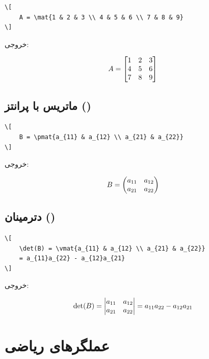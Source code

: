 \begin{latin}
\begin{verbatim}
\[
    A = \mat{1 & 2 & 3 \\ 4 & 5 & 6 \\ 7 & 8 & 9}
\]
\end{verbatim}
\end{latin}

خروجی:

\[
    A = \begin{bmatrix}1 & 2 & 3 \\ 4 & 5 & 6 \\ 7 & 8 & 9\end{bmatrix}
\]

\subsection{ماتریس با پرانتز ()}
\label{sec:math-mat-paren}

\begin{latin}
\begin{verbatim}
\[
    B = \pmat{a_{11} & a_{12} \\ a_{21} & a_{22}}
\]
\end{verbatim}
\end{latin}

خروجی:

\[
    B = \begin{pmatrix}a_{11} & a_{12} \\ a_{21} & a_{22}\end{pmatrix}
\]

\subsection{دترمینان ()}
\label{sec:math-mat-vmatrix}

\begin{latin}
\begin{verbatim}
\[
    \det(B) = \vmat{a_{11} & a_{12} \\ a_{21} & a_{22}}
    = a_{11}a_{22} - a_{12}a_{21}
\]
\end{verbatim}
\end{latin}

خروجی:

\[
    \det(B) = \begin{vmatrix}a_{11} & a_{12} \\ a_{21} & a_{22}\end{vmatrix}
    = a_{11}a_{22} - a_{12}a_{21}
\]


\section{عملگرهای ریاضی}
\label{sec:math-operators}

